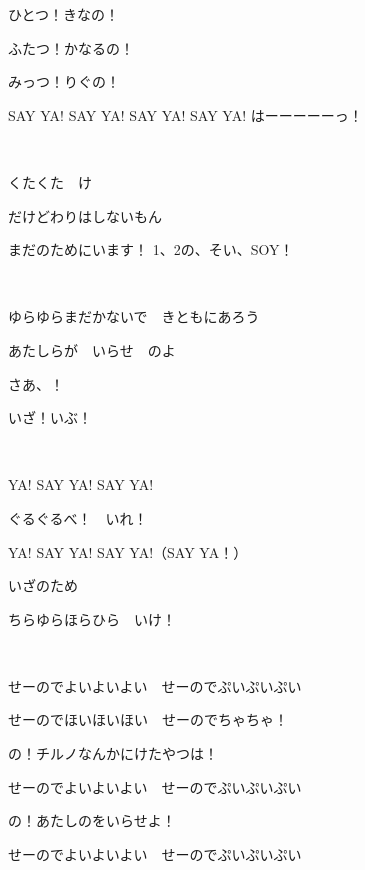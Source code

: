 ひとつ！きなの！

ふたつ！かなるの！

みっつ！りぐの！

SAY YA! SAY YA! SAY YA! SAY YA! はーーーーーっ！

~

くたくた　け

だけどわりはしないもん

まだのためにいます！ 1、2の、そい、SOY！

~

ゆらゆらまだかないで　きともにあろう

あたしらが　いらせ　のよ

さあ、！

いざ！いぶ！

~

YA! SAY YA! SAY YA!

ぐるぐるべ！　いれ！

YA! SAY YA! SAY YA!（SAY YA！）

いざのため

ちらゆらほらひら　いけ！

~

せーのでよいよいよい　せーのでぷいぷいぷい

せーのでほいほいほい　せーのでちゃちゃ！

の！チルノなんかにけたやつは！

せーのでよいよいよい　せーのでぷいぷいぷい

の！あたしのをいらせよ！

せーのでよいよいよい　せーのでぷいぷいぷい

